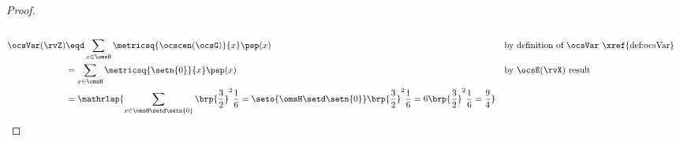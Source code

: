 \begin{tabstr}{0.75}
\begin{proof}
\begin{align*}
  \\
  \ocsVar(\rvZ)
    &\eqd \sum_{x\in\omsH}\metricsq{\ocscen(\ocsG)}{x}\psp(x)
    && \text{by definition of $\ocsVar$ \xref{def:ocsVar}}
  \\&= \sum_{x\in\omsH}\metricsq{\setn{0}}{x}\psp(x)
    && \text{by $\ocsE(\rvX)$ result}
  \\&= \mathrlap{
       \sum_{x\in\omsH\setd\setn{0}}\brp{\frac{3}{2}}^2\frac{1}{6}
     = \seto{\omsH\setd\setn{0}}\brp{\frac{3}{2}}^2\frac{1}{6}
     = 6\brp{\frac{3}{2}}^2\frac{1}{6}
     = \frac{9}{4}
     }
\end{align*}
\end{proof}


\end{tabstr}
